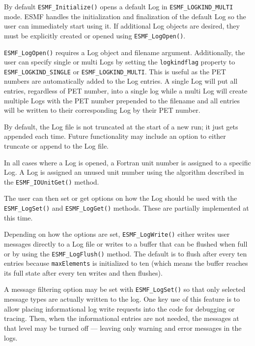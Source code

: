 

By default {\tt ESMF\_Initialize()} opens a default Log in 
{\tt ESMF\_LOGKIND\_MULTI} mode. ESMF handles the initialization and finalization
of the default Log so the user can immediately start using it. If additional Log
objects are desired, they must be explicitly created or opened using
{\tt ESMF\_LogOpen()}.

{\tt ESMF\_LogOpen()} requires a Log object and filename argument. Additionally,
the user can specify single or multi Logs by setting the {\tt logkindflag} property
to {\tt ESMF\_LOGKIND\_SINGLE} or {\tt ESMF\_LOGKIND\_MULTI}.
This is useful as the PET numbers are automatically added to the Log entries.
A single Log will put all entries, regardless of PET number, into a single
log while a multi Log will create multiple Logs with the PET number prepended
to the filename and all entries will be written to their corresponding Log 
by their PET number.
 
By default, the Log file is not truncated at the start of a new run; it just
gets appended each time.  Future functionality may include an option to
either truncate or append to the Log file. 

In all cases where a Log is opened, a Fortran unit number is assigned to a specific
Log.  A Log is assigned an unused unit number using the algorithm described in
the {\tt ESMF\_IOUnitGet()} method.

The user can then set or get options on how the Log should be used 
with the {\tt ESMF\_LogSet()} and {\tt ESMF\_LogGet()} methods.  These are 
partially implemented at this time. 

Depending on how the options are set, {\tt ESMF\_LogWrite()} either writes user
messages directly to a Log file or writes to a buffer that can be flushed when 
full or by using the {\tt ESMF\_LogFlush()} method.  The default is to flush 
after every ten entries because {\tt maxElements} is initialized to ten 
(which means the buffer reaches its full state after every ten writes and then
flushes).

A message filtering option may be set with {\tt ESMF\_LogSet()} so
that only selected message types are actually written to the log.  One key
use of this feature is to allow placing informational log write requests
into the code for debugging or tracing.  Then, when the informational entries
are not needed, the messages at that level may be turned off --- leaving only
warning and error messages in the logs. 

